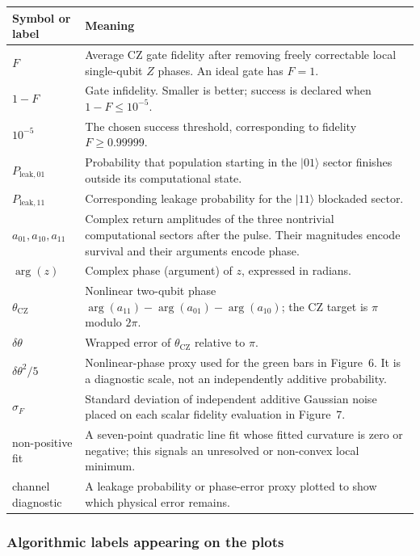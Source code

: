 \documentclass[11pt]{article}
\newcommand{\infid}{1-F}
\newcommand{\target}{10^{-5}}
\begin{document}
\begin{longtable}{p{}p{}}
\toprule
Symbol or label & Meaning\\
\midrule
\endhead
$F$ & Average CZ gate fidelity after removing freely correctable local
single-qubit $Z$ phases.  An ideal gate has $F=1$.\\
$\infid$ & Gate infidelity.  Smaller is better; success is declared when
$\infid\leq\target$.\\
$10^{-5}$ & The chosen success threshold, corresponding to fidelity
$F\geq0.99999$.\\
$P_{\mathrm{leak},01}$ & Probability that population starting in the
$|01\rangle$ sector finishes outside its computational state.\\
$P_{\mathrm{leak},11}$ & Corresponding leakage probability for the
$|11\rangle$ blockaded sector.\\
$a_{01},a_{10},a_{11}$ & Complex return amplitudes of the three nontrivial
computational sectors after the pulse.  Their magnitudes encode survival and
their arguments encode phase.\\
$\arg(z)$ & Complex phase (argument) of $z$, expressed in radians.\\
$\theta_{\mathrm{CZ}}$ & Nonlinear two-qubit phase
$\arg(a_{11})-\arg(a_{01})-\arg(a_{10})$; the CZ target is $\pi$ modulo
$2\pi$.\\
$\delta\theta$ & Wrapped error of $\theta_{\mathrm{CZ}}$ relative to $\pi$.\\
$\delta\theta^2/5$ & Nonlinear-phase proxy used for the green bars in
Figure~6.  It is a diagnostic scale, not an independently additive
probability.\\
$\sigma_F$ & Standard deviation of independent additive Gaussian noise placed
on each scalar fidelity evaluation in Figure~7.\\
non-positive fit & A seven-point quadratic line fit whose fitted curvature is
zero or negative; this signals an unresolved or non-convex local minimum.\\
channel diagnostic & A leakage probability or phase-error proxy plotted to
show which physical error remains.\\
\bottomrule
\end{longtable}

\subsubsection{Algorithmic labels appearing on the plots}
\end{document}
